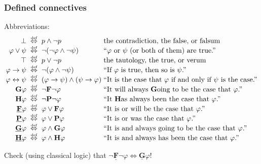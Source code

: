 \documentclass[xcolor=x11names]{beamer}
\newcommand{\FD}{\mathbf F}
\newcommand{\FB}{\mathbf G}
\newcommand{\PD}{\mathbf P}
\newcommand{\PB}{\mathbf H}
\newcommand{\FDDot}{\underline{\mathbf F}}
\newcommand{\FBDot}{\underline{\mathbf G}}
\newcommand{\PDDot}{\underline{\mathbf P}}
\newcommand{\PBDot}{\underline{\mathbf H}}
\newcommand{\defekv}[1][.1]{\hspace{#1cm}\overset{\textup{\tiny def}}{ \Leftrightarrow }\hspace{#1cm}}
\newcommand{\lthen}{\rightarrow}
\newcommand{\liff}{\leftrightarrow}
\newenvironment{tomb}[2][.1]{\arraycolsep=#1cm\begin{array}{#2}}{\end{array}}
\begin{document}
\begin{frame}
	\frametitle{Defined connectives}
\footnotesize

Abbreviations:
\[\begin{tomb}[.05]{rcll}
   \bot  &\defekv & p \land \lnot p& \textup{{the contradiction, the false, or falsum}}
\\ \varphi \lor \psi  &\defekv & \lnot (\lnot \varphi \land \lnot \psi)& \textup{{``$\varphi$ or $\psi$ (or both of them) are true.''}}
\\ \top  &\defekv & p \lor \lnot p& \textup{{the tautology, the true, or verum}}
\\ \varphi \lthen \psi&\defekv & \lnot (\varphi \land \lnot \psi) & \textup{{``If $\varphi$ is true, then so is $\psi$.''}}
\\ \varphi \liff \psi&\defekv & (\varphi \lthen \psi) \land (\psi \lthen \varphi) & \textup{{``It is the case that $\varphi$ if and only if $\psi$ is the case.''}}
\\ \FB \varphi &\defekv &\lnot \FD \lnot \varphi& \textup{{``It will always $\FB$oing to be the case that $\varphi$.''}}
\\ \PB \varphi &\defekv &\lnot \PD \lnot \varphi& \textup{{``It $\PB$as always been the case that $\varphi$.''}}
\\ \FDDot \varphi &\defekv &\varphi \lor \FD \varphi & \textup{{``It is or will be the case that $\varphi$.''}}
\\ \PDDot \varphi &\defekv &\varphi \lor \PD \varphi & \textup{{``It is or was the case that $\varphi$.''}}
\\ \FBDot \varphi &\defekv &\varphi \land \FB \varphi & \textup{{``It is and always going to be the case that $\varphi$.''}}
\\ \PBDot \varphi &\defekv &\varphi \land \PB\varphi& \textup{{``It is and always has been the case that $\varphi$.''}}
\end{tomb}
\]

Check (using classical logic) that $\lnot \FDDot \lnot \varphi \iff \FBDot \varphi$!

\end{frame}
\end{document}
